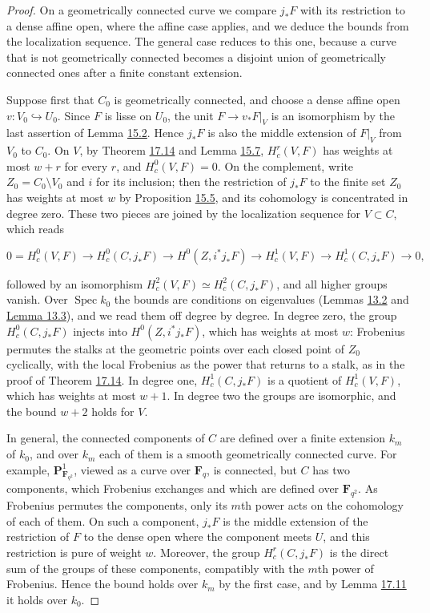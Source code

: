 \documentclass[11pt]{article}
\begin{document}
\begin{proof}[{Proof}]\label{bp270}%
On a geometrically connected curve we compare \(j_*F\) with its restriction to a dense affine open, where the affine case applies, and we deduce the bounds from the localization sequence. The general case reduces to this one, because a curve that is not geometrically connected becomes a disjoint union of geometrically connected ones after a finite constant extension.

Suppose first that \(C_0\) is geometrically connected, and choose a dense affine open \(v:V_0\hookrightarrow U_0\). Since \(F\) is lisse on \(U_0\), the unit \(F\to v_*F|_V\) is an isomorphism by the last assertion of Lemma \hyperref[bp127]{15.2}. Hence \(j_*F\) is also the middle extension of \(F|_V\) from \(V_0\) to \(C_0\). On \(V\), by Theorem \hyperref[bp266]{17.14} and Lemma \hyperref[bp140]{15.7}, \(H_c^r(V,F)\) has weights at most \(w+r\) for every \(r\), and \(H_c^0(V,F)=0\). On the complement, write \(Z_0=C_0\setminus V_0\) and \(i\) for its inclusion; then the restriction of \(j_*F\) to the finite set \(Z_0\) has weights at most \(w\) by Proposition \hyperref[bp134]{15.5}, and its cohomology is concentrated in degree zero. These two pieces are joined by the localization sequence for \(V\subset C\), which reads

\[
0=H_c^0(V,F)\to H_c^0(C,j_*F)\to H^0(Z,i^*j_*F)\to H_c^1(V,F)
\to H_c^1(C,j_*F)\to0,
\]

followed by an isomorphism \(H_c^2(V,F)\simeq H_c^2(C,j_*F)\), and all higher groups vanish. Over \(\operatorname{Spec}k_0\) the bounds are conditions on eigenvalues (Lemmas \hyperref[bp11]{13.2} and \hyperref[bp14]{Lemma 13.3}), and we read them off degree by degree. In degree zero, the group \(H_c^0(C,j_*F)\) injects into \(H^0(Z,i^*j_*F)\), which has weights at most \(w\): Frobenius permutes the stalks at the geometric points over each closed point of \(Z_0\) cyclically, with the local Frobenius as the power that returns to a stalk, as in the proof of Theorem \hyperref[bp266]{17.14}. In degree one, \(H_c^1(C,j_*F)\) is a quotient of \(H_c^1(V,F)\), which has weights at most \(w+1\). In degree two the groups are isomorphic, and the bound \(w+2\) holds for \(V\).

In general, the connected components of \(C\) are defined over a finite extension \(k_m\) of \(k_0\), and over \(k_m\) each of them is a smooth geometrically connected curve. For example, \(\mathbf P^1_{\mathbf F_{q^2}}\), viewed as a curve over \(\mathbf F_q\), is connected, but \(C\) has two components, which Frobenius exchanges and which are defined over \(\mathbf F_{q^2}\). As Frobenius permutes the components, only its \(m\)th power acts on the cohomology of each of them. On such a component, \(j_*F\) is the middle extension of the restriction of \(F\) to the dense open where the component meets \(U\), and this restriction is pure of weight \(w\). Moreover, the group \(H^r_c(C,j_*F)\) is the direct sum of the groups of these components, compatibly with the \(m\)th power of Frobenius. Hence the bound holds over \(k_m\) by the first case, and by Lemma \hyperref[bp257]{17.11} it holds over \(k_0\).
\end{proof}
\end{document}
